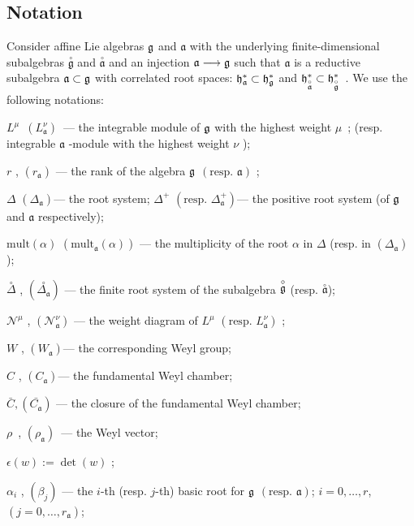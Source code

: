 \documentclass[12pt]{iopart}
\theoremstyle{definition}
\newcommand{\go}{\stackrel{\circ }{\mathfrak{g}}}
\newcommand{\ao}{\stackrel{\circ }{\mathfrak{a}}}
\newcommand{\co}[1]{\stackrel{\circ }{#1}}
\newcommand{\af}{\mathfrak{a}}
\begin{document}
\subsection{Notation}
\label{sec:notation}

Consider affine Lie algebras $\frak{g}$ and $\af$ with the
underlying finite-dimensional subalgebras $\go$ and $%
\ao$ and an injection $\af\longrightarrow \frak{g%
}$ such that $\af$ is a reductive subalgebra $\frak{a\subset g}$ with
correlated root spaces: $\frak{h}_{\af}^{\ast }\subset \frak{h}_{\frak{g%
}}^{\ast }$ and $\frak{h}_{\ao}^{\ast }\subset \frak{h%
}_{\go}^{\ast }$\
.
We use the following notations:

$L^{\mu }$\ $\left( L_{\af}^{\nu }\right) $\ --- the integrable module
of $\frak{g}$ with the highest weight $\mu $\ ; (resp. integrable $\af$
-module with the highest weight $\nu $ );

$r$ , $\left( r_{\af}\right) $ --- the rank of the algebra $\frak{g}$ $%
\left( \mbox{resp. }\af\right) $ ;

$\Delta $ $\left( \Delta _{\af}\right) $--- the root system; $\Delta
^{+} $ $\left( \mbox{resp. }\Delta _{\af}^{+}\right) $--- the positive
root system (of $\frak{g}$ and $\af$ respectively);

$\mathrm{mult}\left( \alpha \right) $ $\left( \mathrm{mult}_{\af}\left(
\alpha \right) \right) $ --- the multiplicity of the root $\alpha$ in $\Delta
$ (resp. in $\left( \Delta _{\af}\right) $);

$\co{\Delta}$ , $\left( \co{\Delta _{\af}}%
\right)$ --- the finite root system of the subalgebra $\co{%
\frak{g}}$ (resp. $\co{\af}$);

$\mathcal{N}^{\mu }$ , $\left( \mathcal{N}_{\af}^{\nu }\right) $ --- the
weight diagram of $L^{\mu }$ $\left( \mbox{resp. }L_{\af}^{\nu }\right)
$ ;

$W$ , $\left( W_{\af}\right) $--- the corresponding Weyl group;

$C$ , $\left( C_{\af}\right) $--- the fundamental Weyl chamber;

$\bar{C}, \left(\bar{C_{\mathfrak{a}}}\right)$ --- the closure of the fundamental Weyl chamber;

$\rho $\ , $\left( \rho _{\af}\right) $\ --- the Weyl vector;

$\epsilon \left( w\right) :=\det \left( w\right) $ ;

$\alpha _{i}$ , $\left( \beta _{j}\right) $ --- the $i
$-th (resp. $j$-th) basic root for $\frak{g}$ $\left( \mbox{resp. }\af%
\right) $; $i=0,\ldots ,r$,\ \ $\left( j=0,\ldots ,r_{\af}\right) $;
\end{document}
